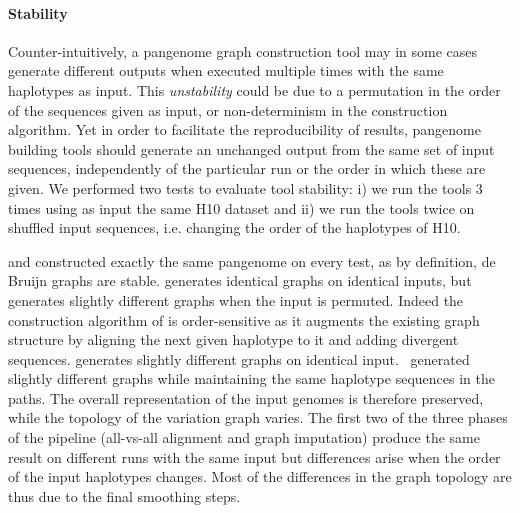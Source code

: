 \paragraph{\textbf{\textup{Stability}}}
Counter-intuitively, a pangenome graph construction tool may in some cases generate different outputs when executed multiple times with the same haplotypes as input. This \emph{unstability} could be due to a permutation in the order of the sequences given as input, or non-determinism in the construction algorithm.
Yet in order to facilitate the reproducibility of results, pangenome building tools should generate an unchanged output from the same set of input sequences, independently of the particular run or the order in which these are given.
We performed two tests to evaluate tool stability: i) we run the tools 3 times using as input the same H10 dataset and ii) we run the tools twice on shuffled input sequences, i.e. changing the order of the haplotypes of H10. 

\bifrost and \mdbg constructed exactly the same pangenome on every test, as by definition, de Bruijn graphs are stable.
\minigraph generates identical graphs on identical inputs, but generates slightly different graphs when the input is permuted. Indeed the construction algorithm of \minigraph is order-sensitive as it augments the existing graph structure by aligning the next given haplotype to it and adding divergent sequences. 
\mcactus generates slightly different graphs on identical input. 
\pggb\ generated slightly different graphs while maintaining the same haplotype sequences in the paths. The overall representation of the input genomes is therefore preserved, while the topology of the variation graph varies. The first two of the three phases of the \pggb pipeline (all-vs-all alignment and graph imputation) produce the same result on different runs with the same input but differences arise when the order of the input haplotypes changes. Most of the differences in the graph topology are thus due to the final smoothing steps.

